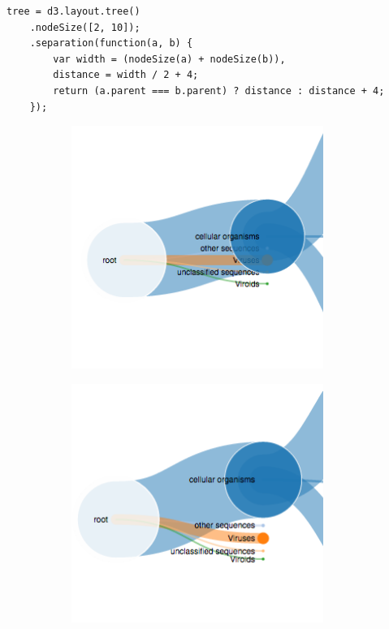 \begin{lstlisting}[caption=Dynamische schaling van plaats tussen nodes in de 
\texttt{treeview}-visualisatie,label=lst:fixseperation]
tree = d3.layout.tree()
    .nodeSize([2, 10]);
    .separation(function(a, b) {
        var width = (nodeSize(a) + nodeSize(b)),
        distance = width / 2 + 4;
        return (a.parent === b.parent) ? distance : distance + 4;
    });
\end{lstlisting}

\begin{figure}
\centering
\begin{subfigure}{0.42\textwidth}
    \centering
    \includegraphics[width=0.9\textwidth]{includes/treeviewbefore}
    \label{fig:treeviewbefore}
\end{subfigure}%
\begin{subfigure}{0.42\textwidth}
    \centering
    \includegraphics[width=0.9\textwidth]{includes/treeviewafter}

\end{subfigure}
\end{figure}
